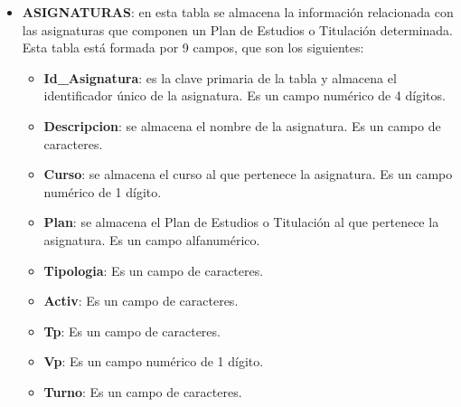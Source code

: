 \begin{itemize}
\item
\textbf{ASIGNATURAS}: en esta tabla se almacena la información relacionada con las asignaturas que componen un Plan de Estudios o Titulación determinada. Esta tabla está formada por 9 campos, que son los siguientes:
\begin{itemize}
\item
\textbf{Id\_Asignatura}: es la clave primaria de la tabla y almacena el identificador único de la asignatura. Es un campo numérico de 4 dígitos.
\item
\textbf{Descripcion}: se almacena el nombre de la asignatura. Es un campo de caracteres.
\item
\textbf{Curso}: se almacena el curso al que pertenece la asignatura. Es un campo numérico de 1 dígito.
\item
\textbf{Plan}: se almacena el Plan de Estudios o Titulación al que pertenece la asignatura. Es un campo alfanumérico.
\item
\textbf{Tipologia}:  Es un campo de caracteres.
\item
\textbf{Activ}:  Es un campo de caracteres.
\item
\textbf{Tp}:  Es un campo de caracteres.
\item
\textbf{Vp}: Es un campo numérico de 1 dígito.
\item
\textbf{Turno}:  Es un campo de caracteres.
\end{itemize}


\newpage



\end{itemize}
